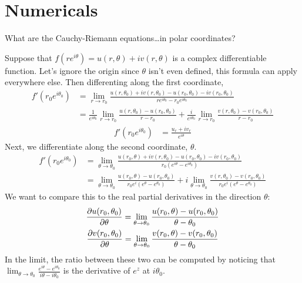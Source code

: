\documentclass{homework}
\begin{document}
     \section{Numericals}

     \begin{problem}\label{cauchy-riemann-polar}
     What are the Cauchy-Riemann equations\ldots in polar coordinates?
     \end{problem}
     \begin{solution}
     Suppose that $f(re^{i\theta}) = u(r, \theta) + iv(r, \theta)$ is a complex differentiable  function. Let's ignore the origin since $\theta$ isn't even defined, this formula can apply everywhere else. Then differenting along the first coordinate,
     \begin{align*}
     f'(r_0e^{i\theta_0}) &=  \lim_{r\to r_0} \frac{u(r, \theta_0) + iv(r, \theta_0) - u(r_0, \theta_0) - iv(r_0, \theta_0)}{re^{i\theta_0} - r_0e^{i\theta_0}}\\
     &= \frac{1}{e^{i\theta_0}}\lim_{r\to r_0} \frac{u(r, \theta_0) - u(r_0, \theta_0)}{r - r_0} + \frac{i}{e^{i\theta_0}} \lim_{r\to r_0} \frac{v(r, \theta_0) - v(r_0, \theta_0)}{r - r_0}
     \end{align*}
     \begin{align}\label{first_rc_polar}
     f'(r_0e^{i\theta_0}) &= \frac{u_r + iv_r}{e^{i\theta}}
     \end{align}
     Next, we differentiate along the second coordinate, $\theta$. 
     \begin{align*}
     f'(r_0e^{i\theta_0}) &=  \lim_{\theta\to \theta_0} \frac{u(r_0, \theta) + iv(r, \theta_0) - u(r_0, \theta_0) - iv(r_0, \theta_0)}{r_0(e^{i\theta} - e^{i\theta_0})}\\
     &= \lim_{\theta\to \theta_0} \frac{u(r_0, \theta) - u(r_0, \theta_0)}{r_0e^{i}(e^\theta - e^{\theta_0})} + i \lim_{\theta\to \theta_0} \frac{v(r, \theta_0) - v(r_0, \theta_0)}{r_0e^{i}(e^\theta - e^{\theta_0})}
     \end{align*}
     We want to compare this to the real partial derivatives in the direction $\theta$:
     \begin{gather*}
     \frac{\partial u(r_0, \theta_0)}{\partial \theta} = \lim_{\theta\to \theta_0} \frac{u(r_0, \theta) - u(r_0, \theta_0)}{\theta - \theta_0}\\
     \frac{\partial v(r_0, \theta_0)}{\partial \theta} = \lim_{\theta\to \theta_0} \frac{v(r_0, \theta) - v(r_0, \theta_0)}{\theta - \theta_0}
     \end{gather*}
     In the limit, the ratio between these two can be computed by noticing that $\lim_{\theta\to\theta_0}\frac{e^{i\theta} - e^{i\theta_0}}{i\theta - i\theta_0}$ is the derivative of $e^z$ at $i\theta_0$.

\end{solution}
\end{document}
